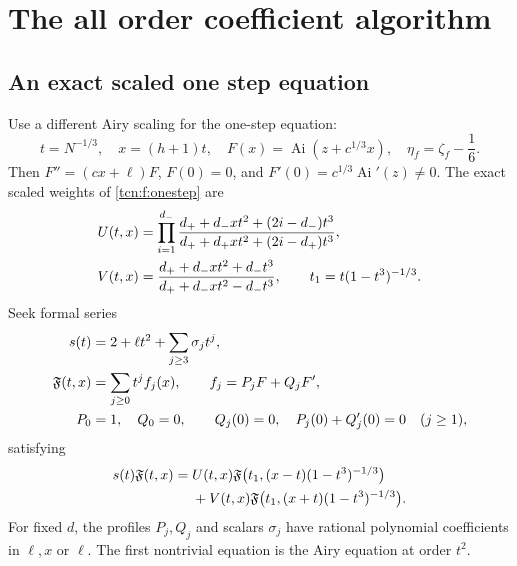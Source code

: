 \documentclass[11pt,letterpaper]{article}
\newcommand{\Ai}{\operatorname{Ai}}
\theoremstyle{remark}
\begin{document}
\section{The all order coefficient algorithm}\label{tcn:f:sec:formal}
\subsection{An exact scaled one step equation}
Use a different Airy scaling for the one-step equation:
\begin{equation}\label{tcn:f:onescaling}
 t=N^{-1/3},\quad x=(h+1)t,\quad
 F(x)=\Ai(z+c^{1/3}x),\quad \eta_f=\zeta_f-\frac16.
\end{equation}
Then $F''=(cx+\ell)F$, $F(0)=0$, and $F'(0)=c^{1/3}\Ai'(z)\ne0$. The exact scaled weights of \eqref{tcn:f:onestep} are
\begin{align}
 U(t,x)&=\prod_{i=1}^{d_-}
 \frac{d_++d_-x t^2+(2i-d_-)t^3}{d_++d_+x t^2+(2i-d_+)t^3},\notag\\
 V(t,x)&=\frac{d_++d_-x t^2+d_-t^3}{d_++d_-x t^2-d_-t^3},\qquad
 t_1=t(1-t^3)^{-1/3}.\label{tcn:f:weights}
\end{align}
Seek formal series
\begin{align}
 s(t)&=2+\ell t^2+\sum_{j\ge3}\sigma_jt^j,\notag\\
 \mathfrak F(t,x)&=\sum_{j\ge0}t^jf_j(x),\qquad f_j=P_jF+Q_jF',\label{tcn:f:formalansatz}\\
 P_0&=1,\quad Q_0=0,\qquad
 Q_j(0)=0,\quad P_j(0)+Q_j'(0)=0\quad(j\ge1),\notag
\end{align}
satisfying
\begin{align}
 s(t)\mathfrak F(t,x)={}&U(t,x)\mathfrak F\bigl(t_1,(x-t)(1-t^3)^{-1/3}\bigr)\notag\\
 &+V(t,x)\mathfrak F\bigl(t_1,(x+t)(1-t^3)^{-1/3}\bigr).\label{tcn:f:formalequation}
\end{align}
For fixed $d$, the profiles $P_j,Q_j$ and scalars $\sigma_j$ have rational polynomial coefficients in $\ell,x$ or $\ell$. The first nontrivial equation is the Airy equation at order $t^2$.
\end{document}
